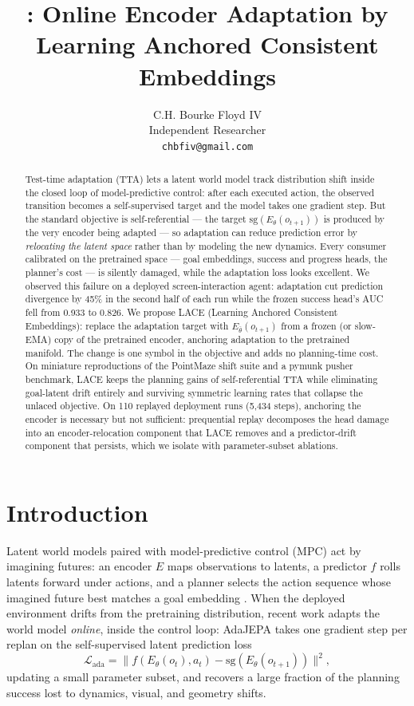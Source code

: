 \documentclass{article}
\title{\lace{}: Online Encoder Adaptation by\\
Learning Anchored Consistent Embeddings}
\author{%
  C.H. Bourke Floyd IV\\
  Independent Researcher\\
  \texttt{chbfiv@gmail.com}
}
\date{}
\newcommand{\lace}{\textsc{LACE}}
\newcommand{\sg}{\mathrm{sg}}
\newcommand{\Estud}{E_{\theta}}
\newcommand{\Efroz}{E_{\bar\theta}}
\begin{document}
\maketitle

\begin{abstract}
Test-time adaptation (TTA) lets a latent world model track distribution shift
inside the closed loop of model-predictive control: after each executed
action, the observed transition becomes a self-supervised target and the model
takes one gradient step. But the standard objective is self-referential --- the
target $\sg(\Estud(o_{t+1}))$ is produced by the very encoder being adapted ---
so adaptation can reduce prediction error by \emph{relocating the latent
space} rather than by modeling the new dynamics. Every consumer calibrated on
the pretrained space --- goal embeddings, success and progress heads, the
planner's cost --- is silently damaged, while the adaptation loss looks
excellent. We observed this failure on a deployed screen-interaction agent:
adaptation cut prediction divergence by 45\% in the second half of each run
while the frozen success head's AUC fell from 0.933 to 0.826. We propose
\lace{} (Learning Anchored Consistent Embeddings): replace the adaptation
target with $\Efroz(o_{t+1})$ from a frozen (or slow-EMA) copy of the
pretrained encoder, anchoring adaptation to the pretrained manifold. The
change is one symbol in the objective and adds no planning-time cost. On
miniature reproductions of the PointMaze shift suite and a pymunk pusher
benchmark, \lace{} keeps the planning gains of self-referential TTA while
eliminating goal-latent drift entirely and surviving symmetric learning rates
that collapse the unlaced objective. On 110 replayed deployment runs
(5{,}434 steps), anchoring the encoder is necessary but not sufficient:
prequential replay decomposes the head damage into an encoder-relocation
component that \lace{} removes and a predictor-drift component that persists,
which we isolate with parameter-subset ablations.
\end{abstract}

\section{Introduction}
\label{sec:intro}

Latent world models paired with model-predictive control (MPC) act by
imagining futures: an encoder $E$ maps observations to latents, a predictor
$f$ rolls latents forward under actions, and a planner selects the action
sequence whose imagined future best matches a goal embedding
\citep{ha2018world,hafner2020dreamer,zhou2024dinowm}. When the deployed
environment drifts from the pretraining distribution, recent work adapts the
world model \emph{online}, inside the control loop: AdaJEPA
\citep{anonymous2026adajepa} takes one gradient step per replan on the
self-supervised latent prediction loss
%
\begin{equation}
\mathcal{L}_{\text{ada}}
  = \big\| f(\Estud(o_t), a_t) - \sg(\Estud(o_{t+1})) \big\|^2 ,
\label{eq:adajepa}
\end{equation}
%
updating a small parameter subset, and recovers a large fraction of the
planning success lost to dynamics, visual, and geometry shifts.
\end{document}
